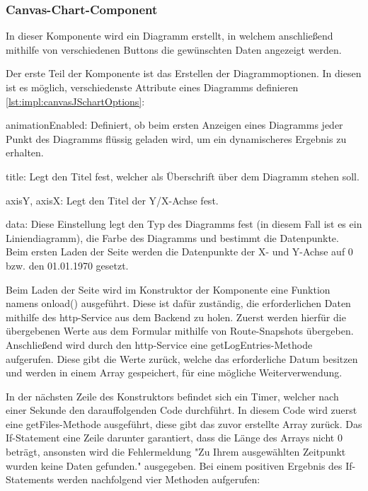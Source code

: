 \subsubsection{Canvas-Chart-Component}


In dieser Komponente wird ein Diagramm erstellt, in welchem anschließend mithilfe von verschiedenen Buttons die gewünschten Daten angezeigt werden.


Der erste Teil der Komponente ist das Erstellen der Diagrammoptionen. In diesen ist es möglich, verschiedenste Attribute eines Diagramms definieren \ref{lst:impl:canvasJSchartOptions}:


\begin{compactitem}
\item animationEnabled: Definiert, ob beim ersten Anzeigen eines Diagramms jeder Punkt des Diagramms flüssig geladen wird, um ein dynamischeres Ergebnis zu erhalten.
\item title: Legt den Titel fest, welcher als Überschrift über dem Diagramm stehen soll.
\item axisY, axisX: Legt den Titel der Y/X-Achse fest.
\item data: Diese Einstellung legt den Typ des Diagramms fest (in diesem Fall ist es ein Liniendiagramm), die Farbe des Diagramms und bestimmt die Datenpunkte. Beim ersten Laden der Seite werden die Datenpunkte der X- und Y-Achse auf 0 bzw. den 01.01.1970 gesetzt.
\end{compactitem}




Beim Laden der Seite wird im Konstruktor der Komponente eine Funktion namens onload() ausgeführt. Diese ist dafür zuständig, die erforderlichen Daten mithilfe des http-Service aus dem Backend zu holen. Zuerst werden hierfür die übergebenen Werte aus dem Formular mithilfe von Route-Snapshots übergeben. Anschließend wird durch den http-Service eine getLogEntries-Methode aufgerufen. Diese gibt die Werte zurück, welche das erforderliche Datum besitzen und werden in einem Array gespeichert, für eine mögliche Weiterverwendung.


In der nächsten Zeile des Konstruktors befindet sich ein Timer, welcher nach einer Sekunde den darauffolgenden Code durchführt. In diesem Code wird zuerst eine getFiles-Methode ausgeführt, diese gibt das zuvor erstellte Array zurück. Das If-Statement eine Zeile darunter garantiert, dass die Länge des Arrays nicht 0 beträgt, ansonsten wird die Fehlermeldung "Zu Ihrem ausgewählten Zeitpunkt wurden keine Daten gefunden." ausgegeben. Bei einem positiven Ergebnis des If-Statements werden nachfolgend vier Methoden aufgerufen:


